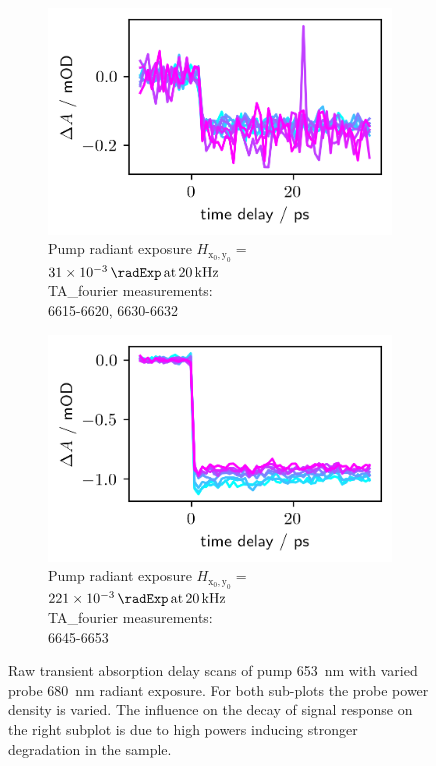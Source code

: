 \documentclass[twoside,openright,listof=numbered]{scrreprt}
\def\pumpExp#1{\ensuremath{\SI{#1}{\radExp}\,\mathrm{at}\, \SI{20}{\kilo\hertz}}}
\def\radiantExp{\ensuremath{H_\mathrm{x_0,y_0}}}
\begin{document}
\begin{figure}[hp]
\centering
\begin{subfigure}[t]{0.45\textwidth}
\centering
\includegraphics[scale=1]{images/PowerVarLowPumpVarProbe.png} 
\caption{Pump radiant exposure $\radiantExp=$\pumpExp{31e-3}\\TA\_fourier measurements:\\ 6615-6620, 6630-6632\label{fig:PowerVarL}}
\end{subfigure}
\hfill
\begin{subfigure}[t]{0.45\textwidth}
\centering
\includegraphics[scale=1]{images/PowerVarHighPumpVariedProbe.png} 
\caption{Pump radiant exposure $\radiantExp=$\pumpExp{221e-3}\\TA\_fourier measurements:\\ 6645-6653\label{fig:PowerVarR}}
\end{subfigure}
\caption[Raw transient absorption delay scans of pump \qty{653}{\nano\meter} with varied probe \qty{680}{\nano\meter} radiant exposure.]{Raw transient absorption delay scans of pump \qty{653}{\nano\meter} with varied probe \qty{680}{\nano\meter} radiant exposure.
For both sub-plots the probe power density is varied. The influence on the decay of signal response on the right subplot is due to high powers inducing stronger degradation in the sample.}
\end{figure}
\end{document}
